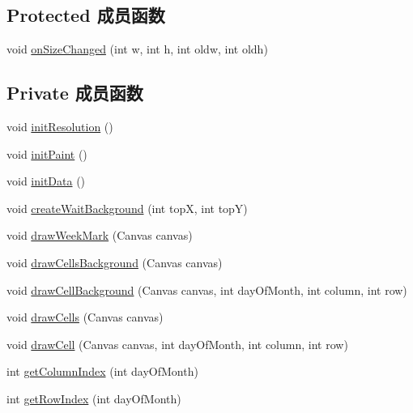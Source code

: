 \subsection*{Protected 成员函数}
\begin{DoxyCompactItemize}
\item 
void \mbox{\hyperlink{classcom_1_1example_1_1akisame__lin_1_1love__air2_1_1_bean_1_1_sign_view_a5e10ad9a0e3a08fb0666ee88a1aa4d8c}{on\+Size\+Changed}} (int w, int h, int oldw, int oldh)
\end{DoxyCompactItemize}
\subsection*{Private 成员函数}
\begin{DoxyCompactItemize}
\item 
void \mbox{\hyperlink{classcom_1_1example_1_1akisame__lin_1_1love__air2_1_1_bean_1_1_sign_view_a4c773f089b6b646967130d2400da2a53}{init\+Resolution}} ()
\item 
void \mbox{\hyperlink{classcom_1_1example_1_1akisame__lin_1_1love__air2_1_1_bean_1_1_sign_view_a21453b89d2d067fa5354da0087bac800}{init\+Paint}} ()
\item 
void \mbox{\hyperlink{classcom_1_1example_1_1akisame__lin_1_1love__air2_1_1_bean_1_1_sign_view_a3ee3f0f3f227212fe2d129ad8a0282ee}{init\+Data}} ()
\item 
void \mbox{\hyperlink{classcom_1_1example_1_1akisame__lin_1_1love__air2_1_1_bean_1_1_sign_view_ae7032d4d8997b261014fdc1c75dba712}{create\+Wait\+Background}} (int topX, int topY)
\item 
void \mbox{\hyperlink{classcom_1_1example_1_1akisame__lin_1_1love__air2_1_1_bean_1_1_sign_view_acb0d1ba261927006d084043142ba1dda}{draw\+Week\+Mark}} (Canvas canvas)
\item 
void \mbox{\hyperlink{classcom_1_1example_1_1akisame__lin_1_1love__air2_1_1_bean_1_1_sign_view_ad945dffb75cd0f4f4bcbf1a37847769e}{draw\+Cells\+Background}} (Canvas canvas)
\item 
void \mbox{\hyperlink{classcom_1_1example_1_1akisame__lin_1_1love__air2_1_1_bean_1_1_sign_view_a4a87800387b1bc59f143f2df134ee34e}{draw\+Cell\+Background}} (Canvas canvas, int day\+Of\+Month, int column, int row)
\item 
void \mbox{\hyperlink{classcom_1_1example_1_1akisame__lin_1_1love__air2_1_1_bean_1_1_sign_view_aeddafe8f6d8783957d842ec0bb61c1f1}{draw\+Cells}} (Canvas canvas)
\item 
void \mbox{\hyperlink{classcom_1_1example_1_1akisame__lin_1_1love__air2_1_1_bean_1_1_sign_view_a8adfd833b6e7952b760be83dd09ad1b5}{draw\+Cell}} (Canvas canvas, int day\+Of\+Month, int column, int row)
\item 
int \mbox{\hyperlink{classcom_1_1example_1_1akisame__lin_1_1love__air2_1_1_bean_1_1_sign_view_ab3ed78a479a94401474531d9a7b5bf26}{get\+Column\+Index}} (int day\+Of\+Month)
\item 
int \mbox{\hyperlink{classcom_1_1example_1_1akisame__lin_1_1love__air2_1_1_bean_1_1_sign_view_a0c39cc9383c666589f706d515a852f7f}{get\+Row\+Index}} (int day\+Of\+Month)
\end{DoxyCompactItemize}
